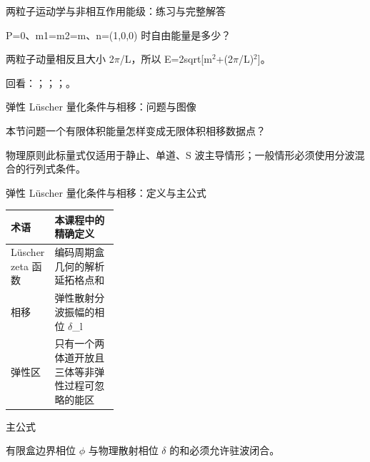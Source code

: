 \begin{frame}[t]{两粒子运动学与非相互作用能级：练习与完整解答}
\footnotesize
\begin{block}{}P=0、m1=m2=m、n=(1,0,0) 时自由能量是多少？\end{block}
\begin{exampleblock}{}两粒子动量相反且大小 2\ensuremath{\pi}/\allowbreak{}L，所以 E=2sqrt[m\ensuremath{^{2}}+(2\ensuremath{\pi}/\allowbreak{}L)\ensuremath{^{2}}]。\end{exampleblock}
\vfill
\scriptsize 回看：；；；。
\end{frame}

\begin{frame}[t]{弹性 Lüscher 量化条件与相移：问题与图像}
\footnotesize
\begin{block}{本节问题}一个有限体积能量怎样变成无限体积相移数据点？\end{block}
\begin{block}{物理原则}\quad 此标量式仅适用于静止、单道、S 波主导情形；一般情形必须使用分波混合的行列式条件。\end{block}
\end{frame}

\begin{frame}[t]{弹性 Lüscher 量化条件与相移：定义与主公式}
\footnotesize\begin{tabularx}{\linewidth}{p{0.30\linewidth}Y}
\toprule 术语 & 本课程中的精确定义\\\midrule
{} Lüscher zeta 函数 & 编码周期盒几何的解析延拓格点和\\
 相移 & 弹性散射分波振幅的相位 \ensuremath{\delta}\_l\\
 弹性区 & 只有一个两体道开放且三体等非弹性过程可忽略的能区\\
\bottomrule\end{tabularx}\vspace{0.15cm}
\begin{block}{ 主公式}\centering{}\end{block}
有限盒边界相位 \ensuremath{\phi} 与物理散射相位 \ensuremath{\delta} 的和必须允许驻波闭合。
\end{frame}

